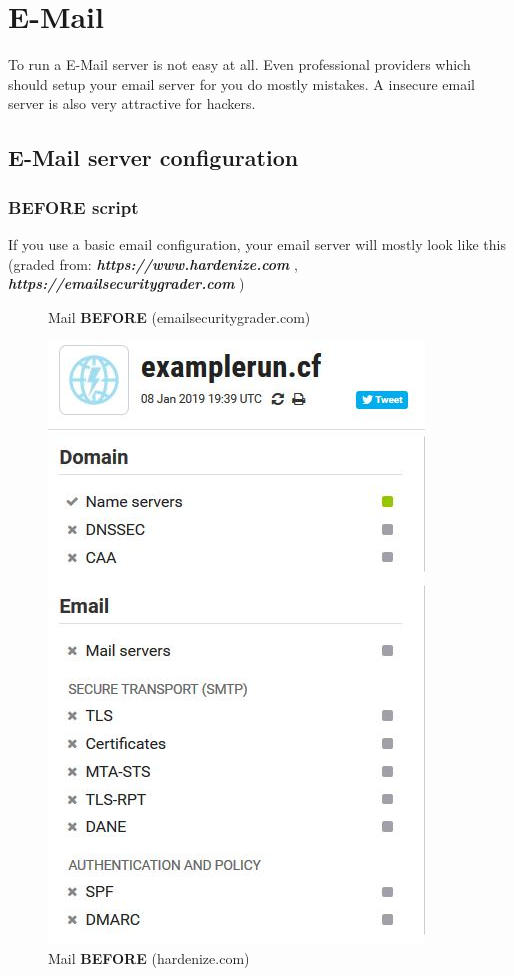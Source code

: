 
\section{E-Mail}
To run a E-Mail server is not easy at all. Even professional providers which should setup your email server for you do mostly mistakes. A insecure email server is also very attractive for hackers. 
\subsection{E-Mail server configuration} 
\subsubsection{BEFORE script}
If you use a basic email configuration, your email server will mostly look like this (graded from: \textbf{\textit{https://www.hardenize.com}} \cite{hardenize}, \textbf{\textit{https://emailsecuritygrader.com}} \cite{emailsec})
\begin{figure}[H]
	\centering
	\caption{Mail \textbf{BEFORE} (emailsecuritygrader.com)}
	\label{fig:emailbeforetest}
\end{figure}
\begin{figure}[H]
	\centering
	\includegraphics[width=0.3\linewidth]{pics/hardenize_before}
	\caption{Mail \textbf{BEFORE} (hardenize.com)}
	\label{fig:hardenizebefore}
\end{figure}

